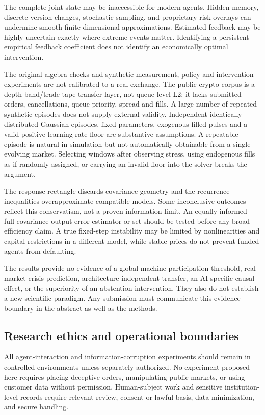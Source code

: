\documentclass[11pt,a4paper]{article}
\theoremstyle{definition}
\theoremstyle{remark}
\begin{document}
The complete joint state may be inaccessible for modern agents. Hidden memory, discrete version changes, stochastic sampling, and proprietary risk overlays can undermine smooth finite-dimensional approximations. Estimated feedback may be highly uncertain exactly where extreme events matter. Identifying a persistent empirical feedback coefficient does not identify an economically optimal intervention.

The original algebra checks and synthetic measurement, policy and intervention experiments are not calibrated to a real exchange. The public crypto corpus is a depth-band/trade-tape transfer layer, not queue-level L2: it lacks submitted orders, cancellations, queue priority, spread and fills. A large number of repeated synthetic episodes does not supply external validity. Independent identically distributed Gaussian episodes, fixed parameters, exogenous filled pulses and a valid positive learning-rate floor are substantive assumptions. A repeatable episode is natural in simulation but not automatically obtainable from a single evolving market. Selecting windows after observing stress, using endogenous fills as if randomly assigned, or carrying an invalid floor into the solver breaks the argument.

The response rectangle discards covariance geometry and the recurrence inequalities overapproximate compatible models. Some inconclusive outcomes reflect this conservatism, not a proven information limit. An equally informed full-covariance output-error estimator or set should be tested before any broad efficiency claim. A true fixed-step instability may be limited by nonlinearities and capital restrictions in a different model, while stable prices do not prevent funded agents from defaulting.

The results provide no evidence of a global machine-participation threshold, real-market crisis prediction, architecture-independent transfer, an AI-specific causal effect, or the superiority of an abstention intervention. They also do not establish a new scientific paradigm. Any submission must communicate this evidence boundary in the abstract as well as the methods.

\subsection{Research ethics and operational boundaries}
All agent-interaction and information-corruption experiments should remain in controlled environments unless separately authorized. No experiment proposed here requires placing deceptive orders, manipulating public markets, or using customer data without permission. Human-subject work and sensitive institution-level records require relevant review, consent or lawful basis, data minimization, and secure handling.
\end{document}
